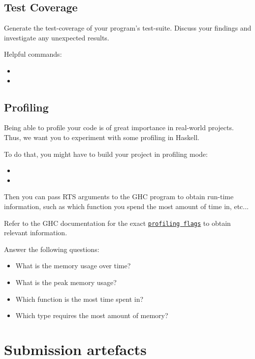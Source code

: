 \documentclass{article}
\begin{document}
\subsection{Test Coverage}

Generate the test-coverage of your program's test-suite.
Discuss your findings and investigate any unexpected results.

Helpful commands:

\begin{itemize}
\item {}
\item {}
\end{itemize}

\subsection{Profiling}

Being able to profile your code is of great importance in real-world projects. Thus, we want you to experiment with some profiling in Haskell.

To do that, you might have to build your project in profiling mode:

\begin{itemize}
\item {}
\item {}
\end{itemize}

Then you can pass RTS arguments to the GHC program to obtain run-time information, such as which function you spend the most amount of time in, etc...

Refer to the GHC documentation for the exact \href{https://downloads.haskell.org/ghc/latest/docs/html/users_guide/profiling.html#profiling-memory-usage}{\texttt{profiling flags}} to obtain relevant information.

Answer the following questions:

\begin{itemize}
\item What is the memory usage over time?
\item What is the peak memory usage?
\item Which function is the most time spent in?
\item Which type requires the most amount of memory?
\end{itemize}

\section{Submission artefacts}
\end{document}

